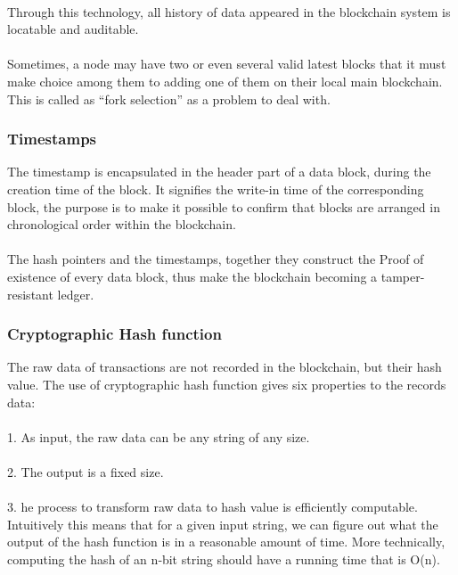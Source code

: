 \documentclass[doublespacing]{bmcart}
\begin{document}
\begin{CJK*}{UTF8}{gbsn}
\paragraph{} 
Through this technology, all history of data appeared in the blockchain system is locatable and auditable.
\paragraph{} 
Sometimes, a node may have two or even several valid latest blocks that it must make choice among them to adding one of them on their local main blockchain. This is called as ``fork selection'' as a problem to deal with.
\subsubsection*{Timestamps}
The timestamp is encapsulated in the header part of a data block, during the creation time of the block. It signifies the write-in time of the corresponding block, the purpose is to make it possible to confirm that blocks are arranged in chronological order within the blockchain.
\paragraph{} 
The hash pointers and the timestamps, together they construct the Proof of existence of every data block, thus make the blockchain becoming a tamper-resistant ledger. 
\subsubsection*{Cryptographic Hash function}
The raw data of transactions are not recorded in the blockchain, but their hash value. The use of cryptographic hash function gives six properties to the records data:
\paragraph{}  1. As input, the raw data can be any string of any size.
\paragraph{}  2. The output is a fixed size.
\paragraph{}  3. he process to transform raw data to hash value is efficiently computable. Intuitively this means that for a given input string, we can figure out what the output of the hash function is in a reasonable amount of time. More technically, computing the hash of an n‐bit string should have a running time that is O(n).

\end{CJK*}
\end{document}
